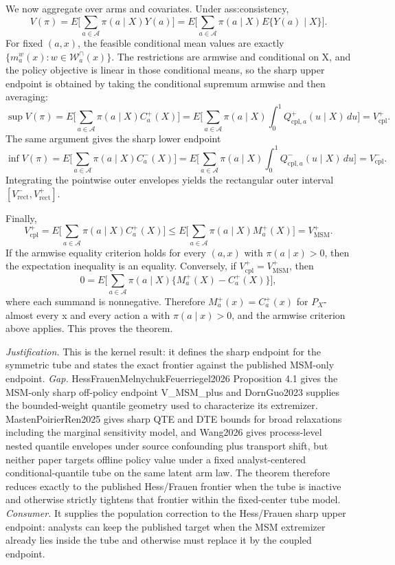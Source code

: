 \documentclass{article}
\begin{document}
We now aggregate over arms and covariates. Under ass:consistency,
\[
V(\pi)=E\Big[\sum_{a\in\mathcal A}\pi(a\mid X)Y(a)\Big]=E\Big[\sum_{a\in\mathcal A}\pi(a\mid X)E\{Y(a)\mid X\}\Big].
\]
For fixed \((a,x)\), the feasible conditional mean values are exactly \(\{m_a^w(x):w\in\mathcal W_a^{\cap}(x)\}\). The restrictions are armwise and conditional on X, and the policy objective is linear in those conditional means, so the sharp upper endpoint is obtained by taking the conditional supremum armwise and then averaging:
\[
\sup V(\pi)=E\Big[\sum_{a\in\mathcal A}\pi(a\mid X)C_a^+(X)\Big]=E\Big[\sum_{a\in\mathcal A}\pi(a\mid X)\int_0^1 Q_{\mathrm{cpl},a}^+(u\mid X)\,du\Big]=V_{\mathrm{cpl}}^+.
\]
The same argument gives the sharp lower endpoint
\[
\inf V(\pi)=E\Big[\sum_{a\in\mathcal A}\pi(a\mid X)C_a^-(X)\Big]=E\Big[\sum_{a\in\mathcal A}\pi(a\mid X)\int_0^1 Q_{\mathrm{cpl},a}^-(u\mid X)\,du\Big]=V_{\mathrm{cpl}}^-.
\]
Integrating the pointwise outer envelopes yields the rectangular outer interval \([V_{\mathrm{rect}}^-,V_{\mathrm{rect}}^+]\).

Finally,
\[
V_{\mathrm{cpl}}^+=E\Big[\sum_{a\in\mathcal A}\pi(a\mid X)C_a^+(X)\Big]\le E\Big[\sum_{a\in\mathcal A}\pi(a\mid X)M_a^+(X)\Big]=V_{\mathrm{MSM}}^+.
\]
If the armwise equality criterion holds for every \((a,x)\) with \(\pi(a\mid x)>0\), then the expectation inequality is an equality. Conversely, if \(V_{\mathrm{cpl}}^+=V_{\mathrm{MSM}}^+\), then
\[
0=E\Big[\sum_{a\in\mathcal A}\pi(a\mid X)\{M_a^+(X)-C_a^+(X)\}\Big],
\]
where each summand is nonnegative. Therefore \(M_a^+(x)=C_a^+(x)\) for \(P_X\)-almost every x and every action a with \(\pi(a\mid x)>0\), and the armwise criterion above applies. This proves the theorem.
\par\smallskip\noindent \textit{Justification.} This is the kernel result: it defines the sharp endpoint for the symmetric tube and states the exact frontier against the published MSM-only endpoint. \textit{Gap.} HessFrauenMelnychukFeuerriegel2026 Proposition 4.1 gives the MSM-only sharp off-policy endpoint V_MSM_plus and DornGuo2023 supplies the bounded-weight quantile geometry used to characterize its extremizer. MastenPoirierRen2025 gives sharp QTE and DTE bounds for broad relaxations including the marginal sensitivity model, and Wang2026 gives process-level nested quantile envelopes under source confounding plus transport shift, but neither paper targets offline policy value under a fixed analyst-centered conditional-quantile tube on the same latent arm law. The theorem therefore reduces exactly to the published Hess/Frauen frontier when the tube is inactive and otherwise strictly tightens that frontier within the fixed-center tube model. \textit{Consumer.} It supplies the population correction to the Hess/Frauen sharp upper endpoint: analysts can keep the published target when the MSM extremizer already lies inside the tube and otherwise must replace it by the coupled endpoint.
\end{document}
